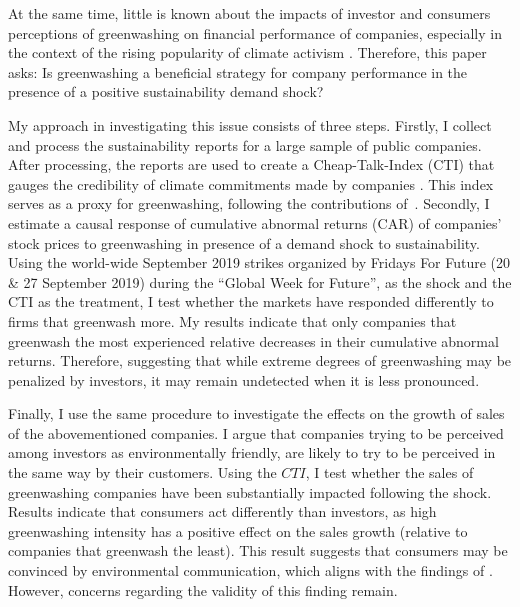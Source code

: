 \documentclass[12pt]{article}
\begin{document}
At the same time, little is known about the impacts of investor and consumers perceptions of greenwashing on financial performance of companies, especially in the context of the rising popularity of climate activism \parencite{pew2021genz}. Therefore, this paper asks: Is greenwashing a beneficial strategy for company performance in the presence of a positive sustainability demand shock?

My approach in investigating this issue consists of three steps. Firstly, I collect and process the sustainability reports for a large sample of public companies. After processing, the reports are used to create a Cheap-Talk-Index (CTI) that gauges the credibility of climate commitments made by companies \parencite{binglerHowCheapTalk2024}. This index serves as a proxy for greenwashing, following the contributions of~\cite{coenAreCorporateClimate2022}. Secondly, I estimate a causal response of cumulative abnormal returns (CAR) of companies' stock prices to greenwashing in presence of a demand shock to sustainability. Using the world-wide September 2019 strikes organized by Fridays For Future (20 \& 27 September 2019) during the ``Global Week for Future'', as the shock and the CTI as the treatment, I test whether the markets have responded differently to firms that greenwash more. My results indicate that only companies that greenwash the most experienced relative decreases in their cumulative abnormal returns. Therefore, suggesting that while extreme degrees of greenwashing may be penalized by investors, it may remain undetected when it is less pronounced.

Finally, I use the same procedure to investigate the effects on the growth of sales of the abovementioned companies. I argue that companies trying to be perceived among investors as environmentally friendly, are likely to try to be perceived in the same way by their customers. Using the $CTI$, I test whether the sales of greenwashing companies have been substantially impacted following the shock. Results indicate that consumers act differently than investors, as high greenwashing intensity has a positive effect on the sales growth (relative to companies that greenwash the least). This result suggests that consumers may be convinced by environmental communication, which aligns with the findings of \textcite{schmuckMisleadingConsumersGreen2018,parguelCanEvokingNature2015}. However, concerns regarding the validity of this finding remain.
 
\end{document}
